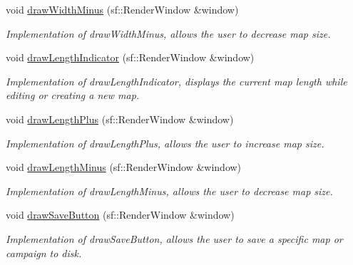 \begin{DoxyCompactItemize}
\hypertarget{classUi_a7c56214cbef2ae77cb8a030bb8edb726}{}\label{classUi_a7c56214cbef2ae77cb8a030bb8edb726} 
void \hyperlink{classUi_a7c56214cbef2ae77cb8a030bb8edb726}{draw\+Width\+Minus} (sf\+::\+Render\+Window \&window)
\begin{DoxyCompactList}\small\item\em Implementation of draw\+Width\+Minus, allows the user to decrease map size. \end{DoxyCompactList}\item 
\hypertarget{classUi_af3d1306408b1ae6b83baab23a1f61cf3}{}\label{classUi_af3d1306408b1ae6b83baab23a1f61cf3} 
void \hyperlink{classUi_af3d1306408b1ae6b83baab23a1f61cf3}{draw\+Length\+Indicator} (sf\+::\+Render\+Window \&window)
\begin{DoxyCompactList}\small\item\em Implementation of draw\+Length\+Indicator, displays the current map length while editing or creating a new map. \end{DoxyCompactList}\item 
\hypertarget{classUi_a5578f4f7d537d3051805ccebcc5ead7e}{}\label{classUi_a5578f4f7d537d3051805ccebcc5ead7e} 
void \hyperlink{classUi_a5578f4f7d537d3051805ccebcc5ead7e}{draw\+Length\+Plus} (sf\+::\+Render\+Window \&window)
\begin{DoxyCompactList}\small\item\em Implementation of draw\+Length\+Plus, allows the user to increase map size. \end{DoxyCompactList}\item 
\hypertarget{classUi_a26d13b7d202857f79c5890f38cfe9898}{}\label{classUi_a26d13b7d202857f79c5890f38cfe9898} 
void \hyperlink{classUi_a26d13b7d202857f79c5890f38cfe9898}{draw\+Length\+Minus} (sf\+::\+Render\+Window \&window)
\begin{DoxyCompactList}\small\item\em Implementation of draw\+Length\+Minus, allows the user to decrease map size. \end{DoxyCompactList}\item 
\hypertarget{classUi_a7b521d5a8b4fc39bf989d3d6c71c8cb6}{}\label{classUi_a7b521d5a8b4fc39bf989d3d6c71c8cb6} 
void \hyperlink{classUi_a7b521d5a8b4fc39bf989d3d6c71c8cb6}{draw\+Save\+Button} (sf\+::\+Render\+Window \&window)
\begin{DoxyCompactList}\small\item\em Implementation of draw\+Save\+Button, allows the user to save a specific map or campaign to disk. \end{DoxyCompactList}\item 

\end{DoxyCompactItemize}
